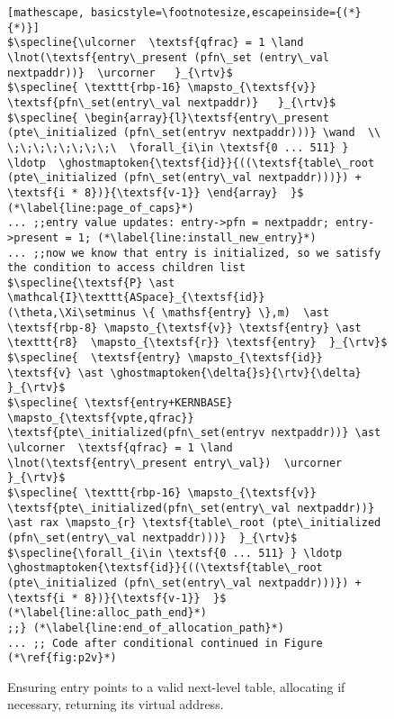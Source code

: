 \begin{figure}
\begin{lstlisting}[mathescape, basicstyle=\footnotesize,escapeinside={(*}{*)}]
$\specline{\ulcorner  \textsf{qfrac} = 1 \land \lnot(\textsf{entry\_present (pfn\_set (entry\_val nextpaddr))}  \urcorner   }_{\rtv}$
$\specline{ \texttt{rbp-16} \mapsto_{\textsf{v}} \textsf{pfn\_set(entry\_val nextpaddr)}   }_{\rtv}$
$\specline{ \begin{array}{l}\textsf{entry\_present (pte\_initialized (pfn\_set(entryv nextpaddr)))} \wand  \\ \;\;\;\;\;\;\;\;\  \forall_{i\in \textsf{0 ... 511} } \ldotp  \ghostmaptoken{\textsf{id}}{((\textsf{table\_root (pte\_initialized (pfn\_set(entry\_val nextpaddr)))}) + \textsf{i * 8})}{\textsf{v-1}} \end{array}  }$ (*\label{line:page_of_caps}*)
... ;;entry value updates: entry->pfn = nextpaddr; entry->present = 1; (*\label{line:install_new_entry}*)
... ;;now we know that entry is initialized, so we satisfy the condition to access children list
$\specline{\textsf{P} \ast \mathcal{I}\texttt{ASpace}_{\textsf{id}}(\theta,\Xi\setminus \{ \mathsf{entry} \},m)  \ast \textsf{rbp-8} \mapsto_{\textsf{v}} \textsf{entry} \ast \texttt{r8}  \mapsto_{\textsf{r}} \textsf{entry}  }_{\rtv}$
$\specline{  \textsf{entry} \mapsto_{\textsf{id}} \textsf{v} \ast \ghostmaptoken{\delta{}s}{\rtv}{\delta} }_{\rtv}$
$\specline{ \textsf{entry+KERNBASE} \mapsto_{\textsf{vpte,qfrac}}  \textsf{pte\_initialized(pfn\_set(entryv nextpaddr))} \ast \ulcorner  \textsf{qfrac} = 1 \land \lnot(\textsf{entry\_present entry\_val})  \urcorner }_{\rtv}$
$\specline{ \texttt{rbp-16} \mapsto_{\textsf{v}} \textsf{pte\_initialized(pfn\_set(entry\_val nextpaddr))}  \ast rax \mapsto_{r} \textsf{table\_root (pte\_initialized (pfn\_set(entry\_val nextpaddr)))}  }_{\rtv}$
$\specline{\forall_{i\in \textsf{0 ... 511} } \ldotp  \ghostmaptoken{\textsf{id}}{((\textsf{table\_root (pte\_initialized (pfn\_set(entry\_val nextpaddr)))}) + \textsf{i * 8})}{\textsf{v-1}}  }$ (*\label{line:alloc_path_end}*)
;;} (*\label{line:end_of_allocation_path}*)
... ;; Code after conditional continued in Figure (*\ref{fig:p2v}*)
\end{lstlisting}
\fi
\vspace{-1em}
\caption{Ensuring \textsf{entry} points to a valid next-level table, allocating if necessary, returning its virtual address.}
\label{fig:calltopteinitializeC}
\vspace{-1em}
\end{figure}

